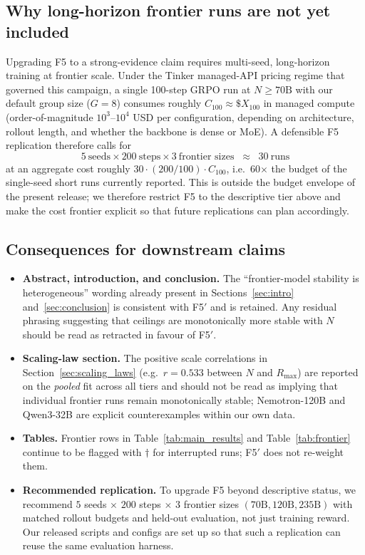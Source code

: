 \subsection{Why long-horizon frontier runs are not yet included}

Upgrading F5 to a strong-evidence claim requires multi-seed, long-horizon
training at frontier scale. Under the Tinker managed-API pricing regime that
governed this campaign, a single 100-step GRPO run at $N\geq 70\mathrm{B}$
with our default group size ($G=8$) consumes roughly $C_{100} \approx
\$X_{100}$ in managed compute (order-of-magnitude $10^{3}$--$10^{4}$ USD per
configuration, depending on architecture, rollout length, and whether the
backbone is dense or MoE). A defensible F5 replication therefore calls for
\[
5\ \text{seeds} \times 200\ \text{steps} \times 3\ \text{frontier sizes}
\;\;\approx\;\; 30\ \text{runs}
\]
at an aggregate cost roughly $30 \cdot (200/100) \cdot C_{100}$, i.e.\ 60$\times$
the budget of the single-seed short runs currently reported. This is outside
the budget envelope of the present release; we therefore restrict F5 to the
descriptive tier above and make the cost frontier explicit so that future
replications can plan accordingly.

\subsection{Consequences for downstream claims}

\begin{itemize}
    \item \textbf{Abstract, introduction, and conclusion.} The ``frontier-model
    stability is heterogeneous'' wording already present in
    Sections~\ref{sec:intro} and~\ref{sec:conclusion} is consistent with
    F5$'$ and is retained. Any residual phrasing suggesting that ceilings
    are monotonically more stable with $N$ should be read as retracted in
    favour of F5$'$.
    \item \textbf{Scaling-law section.} The positive scale correlations in
    Section~\ref{sec:scaling_laws} (e.g.\ $r=0.533$ between $N$ and
    $R_{\max}$) are reported on the \emph{pooled} fit across all tiers and
    should not be read as implying that individual frontier runs remain
    monotonically stable; Nemotron-120B and Qwen3-32B are explicit
    counterexamples within our own data.
    \item \textbf{Tables.} Frontier rows in Table~\ref{tab:main_results} and
    Table~\ref{tab:frontier} continue to be flagged with $\dagger$ for
    interrupted runs; F5$'$ does not re-weight them.
    \item \textbf{Recommended replication.} To upgrade F5 beyond descriptive
    status, we recommend $5$ seeds $\times$ $200$ steps $\times$ $3$
    frontier sizes $(70\mathrm{B}, 120\mathrm{B}, 235\mathrm{B})$ with
    matched rollout budgets and held-out evaluation, not just training
    reward. Our released scripts and configs are set up so that such a
    replication can reuse the same evaluation harness.
\end{itemize}

